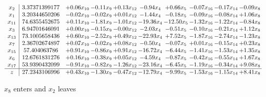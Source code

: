 \documentclass[9pt]{article}
\begin{document}
 \[\begin{array}{c| c c@{\hskip 2pt} c@{\hskip 2pt} c@{\hskip 2pt} c@{\hskip 2pt} c@{\hskip 2pt} c@{\hskip 2pt} c@{\hskip 2pt} c@{\hskip 2pt} }
 x_{2}   &  3.37371399177 & +  0.06 x_{10} & -0.11 x_{9} & +  0.13 x_{12} & -0.94 x_{4} & +  0.66 x_{5} & -0.07 x_{16} & -0.17 x_{14} & -0.09 x_{8}\\
 x_{1}   &  3.20344650206 & -0.02 x_{10} & -0.02 x_{9} & +  0.01 x_{12} & -1.44 x_{4} & -0.18 x_{5} & -0.09 x_{16} & -0.08 x_{14} & +  1.06 x_{8}\\
 x_{11}   &  74.6355452675 & +  0.11 x_{10} & -1.81 x_{9} & -1.01 x_{12} & -19.36 x_{4} & -12.50 x_{5} & -1.32 x_{16} & -1.22 x_{14} & -0.84 x_{8}\\
 x_{3}   &  6.94701646091 & +  0.00 x_{10} & -0.15 x_{9} & -0.00 x_{12} & -2.03 x_{4} & -0.51 x_{5} & -0.10 x_{16} & -0.21 x_{14} & +  1.12 x_{8}\\
 x_{13}   &  73.1005658436 & +  0.60 x_{10} & -2.52 x_{9} & +  0.49 x_{12} & -22.93 x_{4} & +  7.52 x_{5} & -1.87 x_{16} & -2.74 x_{14} & -1.23 x_{8}\\
 x_{7}   &  2.36702674897 & +  0.07 x_{10} & -0.02 x_{9} & +  0.08 x_{12} & -0.50 x_{4} & -0.07 x_{5} & +  0.01 x_{16} & -0.15 x_{14} & +  0.23 x_{8}\\
 x_{15}   &  57.404063786 & +  0.91 x_{10} & -0.86 x_{9} & +  0.91 x_{12} & -16.72 x_{4} & -6.44 x_{5} & -1.41 x_{16} & -1.53 x_{14} & +  1.35 x_{8}\\
 x_{6}   &  12.6761831276 & +  0.16 x_{10} & -0.38 x_{9} & +  0.05 x_{12} & -4.59 x_{4} & -0.87 x_{5} & -0.42 x_{16} & -0.55 x_{14} & +  1.67 x_{8}\\
 x_{17}   &  53.9390432099 & -0.91 x_{10} & -0.82 x_{9} & -1.26 x_{12} & -23.16 x_{4} & -6.45 x_{5} & -1.19 x_{16} & -0.34 x_{14} & +  9.08 x_{8}\\
\hline
z    &  27.2343106996 & +  0.43 x_{10} & -1.30 x_{9} & -0.47 x_{12} & -12.79 x_{4} & -9.99 x_{5} & -1.53 x_{16} & -1.15 x_{14} & +  8.41 x_{8}\\
\end{array}\]


 $ x_{8} $ enters and $ x_{2} $ leaves 
\end{document}
